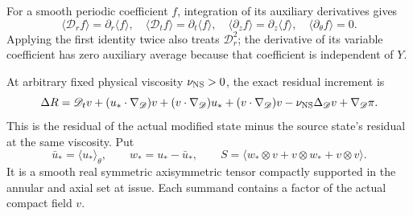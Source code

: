 \documentclass[11pt]{article}
\begin{document}
For a smooth periodic coefficient $f$, integration of its auxiliary
derivatives gives
\begin{equation}\label{mcstress:average_derivatives}
 \langle\mathscr D_r f\rangle=\partial_r\langle f\rangle,
 \quad \langle\mathscr D_t f\rangle=\partial_t\langle f\rangle,
 \quad \langle\partial_z f\rangle=\partial_z\langle f\rangle,
 \quad \langle\partial_\theta f\rangle=0.
\end{equation}
Applying the first identity twice also treats $\mathscr D_r^2$;
the derivative of its variable coefficient has zero auxiliary average
because that coefficient is independent of $Y$.

At arbitrary fixed physical viscosity $\nu_{\rm NS}>0$, the exact
residual increment is
\begin{equation}\label{mcstress:residual_increment}
 \Delta R=\mathscr D_t v+(u_*\cdot\nabla_{\mathscr D})v
 +(v\cdot\nabla_{\mathscr D})u_*
 +(v\cdot\nabla_{\mathscr D})v
 -\nu_{\rm NS}\Delta_{\mathscr D}v+\nabla_{\mathscr D}\pi.
\end{equation}
This is the residual of the actual modified state minus the source
state's residual at the same viscosity. Put
\begin{equation}\label{mcstress:actual_tensor}
 \bar u_* =\langle u_*\rangle_\theta,\qquad
 w_*=u_*-\bar u_*,\qquad
 S=\langle w_*\otimes v+v\otimes w_*+v\otimes v\rangle.
\end{equation}
It is a smooth real symmetric axisymmetric tensor compactly supported
in the annular and axial set at issue. Each summand contains a factor
of the actual compact field $v$.
\end{document}
